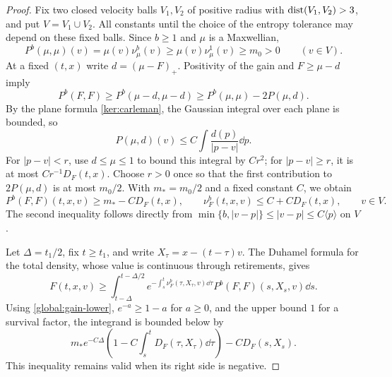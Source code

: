 \begin{proof}
Fix two closed velocity balls $V_1,V_2$ of positive radius with
$\operatorname{dist}(V_1,V_2)>3$, and put $V=V_1\cup V_2$.  All constants until the
choice of the entropy tolerance may depend on these fixed balls.
Since $b\ge1$ and $\mu$ is a Maxwellian,
\[
 P^b(\mu,\mu)(v)=\mu(v)\nu_\mu^b(v)
 \ge \mu(v)\nu_\mu^1(v)\ge m_0>0
 \qquad(v\in V).
\]
At a fixed $(t,x)$ write $d=(\mu-F)_+$.  Positivity of the gain and
$F\ge\mu-d$ imply
\[
 P^b(F,F)\ge P^b(\mu-d,\mu-d)
 \ge P^b(\mu,\mu)-2P(\mu,d).
\]
By the plane formula \eqref{ker:carleman}, the Gaussian integral over
each plane is bounded, so
\[
 P(\mu,d)(v)\le C\int\frac{d(p)}{|p-v|}\dd p.
\]
For $|p-v|<r$, use $d\le\mu\le1$ to bound this integral by $Cr^2$;
for $|p-v|\ge r$, it is at most $Cr^{-1}D_F(t,x)$.  Choose $r>0$
once so that the first contribution to $2P(\mu,d)$ is at most $m_0/2$.
With $m_*=m_0/2$ and a fixed constant $C$, we obtain
\begin{equation}\label{global:gain-lower}
 P^b(F,F)(t,x,v)\ge m_*-CD_F(t,x),\qquad
 \nu_F^b(t,x,v)\le C+CD_F(t,x),\qquad v\in V.
\end{equation}
The second inequality follows directly from
$\min\{b,|v-p|\}\le |v-p|\le C\langle p\rangle$ on $V$.

Let $\Delta=t_1/2$, fix $t\ge t_1$, and write
$X_\tau=x-(t-\tau)v$.  The Duhamel formula for the total density,
whose value is continuous through retirements, gives
\[
 F(t,x,v)\ge
 \int_{t-\Delta}^{t-\Delta/2}
 e^{-\int_s^t\nu_F^b(\tau,X_\tau,v)\dd\tau}
 P^b(F,F)(s,X_s,v)\dd s.
\]
Using \eqref{global:gain-lower}, $e^{-a}\ge1-a$ for $a\ge0$, and the
upper bound $1$ for a survival factor, the integrand is bounded below by
\begin{equation}\label{global:survival-lower}
 m_*e^{-C\Delta}
 \left(1-C\int_s^t D_F(\tau,X_\tau)\dd\tau\right)
 -CD_F(s,X_s).
\end{equation}
This inequality remains valid when its right side is negative.


\end{proof}
